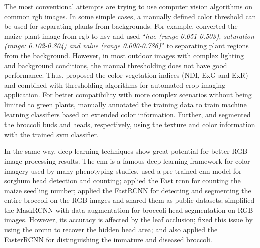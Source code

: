 
The most conventional attempts are trying to use computer vision algorithms on common \gls{rgb} images. In some simple cases, a manually defined color threshold can be used for separating plants from backgrounds. For example, \citet{choudhury_holistic_2018} converted the maize plant image from \gls{rgb} to \gls{hsv} and used ``\textit{hue (range 0.051-0.503), saturation (range: 0.102-0.804) and value (range 0.000-0.786)}'' to separating plant regions from the background. However, in most outdoor images with complex lighting and background conditions, the manual thresholding does not have good performance. Thus, \citet{meyer_verification_2008} proposed the color vegetation indices (NDI, ExG and ExR) and combined with \citet{otsu_threshold_1979} thresholding algorithms for automated crop imaging application. For better compatibility with more complex scenarios without being limited to green plants, \citet{guo_easypcc_2017} manually annotated the training data to train machine learning classifiers based on extended color information. Further, \citet{zou_broccoli_2019} and \citet{blok_machine_2016} segmented the broccoli buds and heads, respectively, using the texture and color information with the trained \gls{svm} classifier.

In the same way, deep learning techniques show great potential for better RGB image processing results. The \gls{cnn} is a famous deep learning framework for color imagery used by many phenotyping studies. \citet{ghosal_weakly_2019} used a pre-trained \gls{cnn} model for sorghum head detection and counting; \citet{liu_estimating_2022} applied the Fast \gls{rcnn} for counting the maize seedling number; \citet{bender_high_2020} applied the FastRCNN for detecting and segmenting the entire broccoli on the RGB images and shared them as public datasets; \citet{blok_effect_2021} simplified the MaskRCNN with data augmentation for broccoli head segmentation on RGB images. However, its accuracy is affected by the leaf occlusion; \citet{blok_image_2021} fixed this issue by using the \gls{orcnn} to recover the hidden head area; and \citet{garcia_towards_2021} also applied the FasterRCNN for distinguishing the immature and diseased broccoli. 
 

